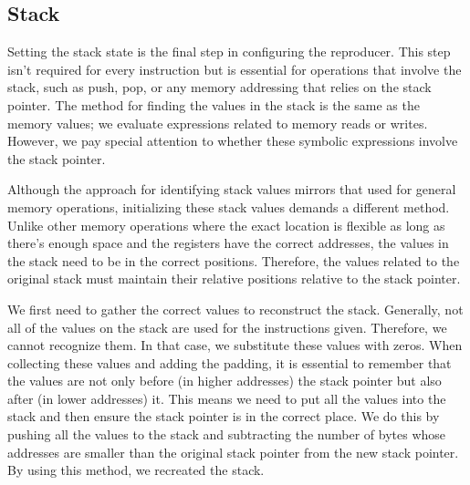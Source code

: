 \subsection{Stack}
Setting the stack state is the final step in configuring the reproducer.
This step isn't required for every instruction but is essential for operations that involve the stack, such as push, pop, or any memory addressing that relies on the stack pointer.
The method for finding the values in the stack is the same as the memory values; we evaluate expressions related to memory reads or writes.
However, we pay special attention to whether these symbolic expressions involve the stack pointer.

Although the approach for identifying stack values mirrors that used for general memory operations, initializing these stack values demands a different method.
Unlike other memory operations where the exact location is flexible as long as there's enough space and the registers have the correct addresses, the values in the stack need to be in the correct positions.
Therefore, the values related to the original stack must maintain their relative positions relative to the stack pointer.

We first need to gather the correct values to reconstruct the stack.
Generally, not all of the values on the stack are used for the instructions given.
Therefore, we cannot recognize them.
In that case, we substitute these values with zeros.
When collecting these values and adding the padding, it is essential to remember that the values are not only before (in higher addresses) the stack pointer but also after (in lower addresses) it.
This means we need to put all the values into the stack and then ensure the stack pointer is in the correct place.
We do this by pushing all the values to the stack and subtracting the number of bytes whose addresses are smaller than the original stack pointer from the new stack pointer.
By using this method, we recreated the stack.

